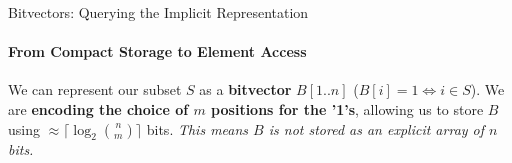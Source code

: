 \begin{frame}{Bitvectors: Querying the Implicit Representation}
    \framesubtitle{From Compact Storage to Element Access}

    We can represent our subset $S$ as a \textbf{bitvector} $B[1..n]$ ($B[i]=1 \iff i \in S$). We are \textbf{encoding the choice of $m$ positions for the '1's}, allowing us to store $B$ using $\approx \lceil \log_2 \binom{n}{m} \rceil$ bits. \textit{This means $B$ is not stored as an explicit array of $n$ bits.}

    \begin{figure}[htbp]
        \centering
        \vspace{-0.5em} %
    \end{figure}

    \pause %


    \pause %


\end{frame}
